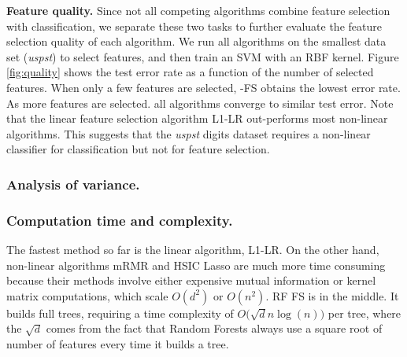\textbf{Feature quality.}
Since not all competing algorithms combine feature selection with classification, we separate these two tasks to further evaluate the feature selection quality of each algorithm. We run all algorithms on the smallest data set (\emph{uspst}) to select features, and then train an SVM with an RBF kernel. Figure \ref{fig:quality} shows the test error rate as a function of the number of selected features. When only a few features are selected, \name{}-FS obtains the lowest error rate. As more features are selected. all algorithms converge to similar test error. Note that the linear feature selection algorithm L1-LR out-performs most non-linear algorithms. This suggests that the \emph{uspst} digits dataset requires a non-linear classifier for classification but not for feature selection.





\subsubsection{Analysis of variance.}

\subsubsection{Computation time and complexity.} 
The fastest method so far is the linear algorithm, L1-LR. On the other hand, non-linear algorithms mRMR and HSIC Lasso are much more time consuming because their methods involve either expensive mutual information or kernel matrix computations, which scale $O(d^2)$ or $O(n^2)$. RF FS is in the middle. It builds full trees, requiring a time complexity of $O\Big(\sqrt{d}n\log(n)\Big)$ per tree, where the $\sqrt{d}$ comes from the fact that Random Forests always use a square root of number of features every time it builds a tree. 

